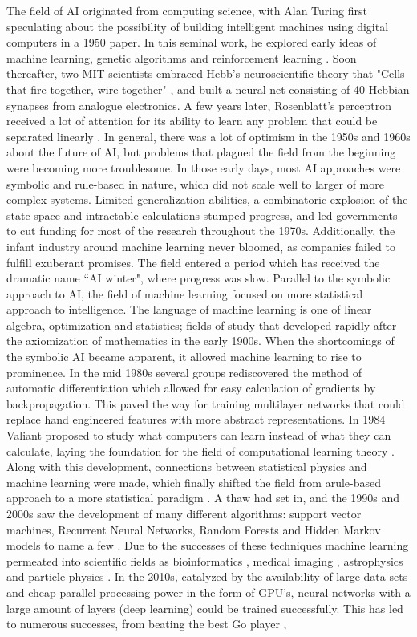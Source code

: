 \noindent The field of AI originated from computing science, with Alan Turing first speculating about the possibility of building intelligent machines using digital computers in a 1950 paper. In this seminal work, he explored early ideas of machine learning, genetic algorithms and reinforcement learning \cite{Turing1950}. Soon thereafter, two MIT scientists embraced Hebb's neuroscientific theory that "Cells that fire together, wire together" \cite{Hebb1949}, and built a neural net consisting of 40 Hebbian synapses from analogue electronics. A few years later, Rosenblatt's perceptron received a lot of attention for its ability to learn any problem that could be separated linearly \cite{Rosenblatt1958}. In general, there was a lot of optimism in the 1950s and 1960s about the future of AI, but problems that plagued the field from the beginning were becoming more troublesome. In those early days, most AI approaches were symbolic and rule-based in nature, which did not scale well to larger of more complex systems. Limited generalization abilities, a combinatoric explosion of the state space and intractable calculations stumped progress, and led governments to cut funding for most of the research throughout the 1970s. Additionally, the infant industry around machine learning never bloomed, as companies failed to fulfill exuberant promises. The field entered a period which has received the dramatic name ``AI winter", where progress was slow. Parallel to the symbolic approach to AI, the field of machine learning focused on more statistical approach to intelligence. The language of machine learning is one of linear algebra, optimization and statistics;  fields of study that developed rapidly after the axiomization of mathematics in the early 1900s. When the shortcomings of the symbolic AI became apparent, it allowed machine learning to rise to prominence. In the mid 1980s several groups rediscovered the method of automatic differentiation which allowed for easy calculation of gradients by backpropagation. This paved the way for training multilayer networks that could replace hand engineered features with more abstract representations. In 1984 Valiant proposed to study what computers can learn instead of what they can calculate, laying the foundation for the field of computational learning theory \cite{Valiant1984}. Along with this development, connections between statistical physics and machine learning were made, which finally shifted the field from arule-based approach to a more statistical paradigm \cite{Carleo2019}. A thaw had set in, and the 1990s and 2000s saw the development of many different algorithms: support vector machines, Recurrent Neural Networks, Random Forests and Hidden Markov models to name a few \cite{LeCun1998, Russell2003}. Due to the successes of these techniques machine learning permeated into scientific fields as bioinformatics \cite{Larranaga2006}, medical imaging \cite{Chartrand2017}, astrophysics \cite{Collister2004} and particle physics \cite{Radovic2018}. In the 2010s, catalyzed by the availability of large data sets and cheap parallel processing power in the form of GPU's, neural networks with a large amount of layers (deep learning) could be trained successfully. This has led to numerous successes, from beating the best Go player \cite{Silver2016}, 